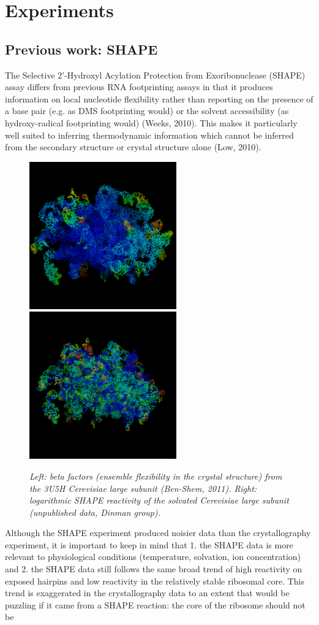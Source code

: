 \documentclass[a4paper,12pt]{article}
\begin{document}
\section{Experiments}
\subsection{Previous work: SHAPE}
The Selective 2'-Hydroxyl Acylation Protection from Exoribonuclease (SHAPE) assay differs from previous RNA footprinting assays in that it produces information on local nucleotide flexibility rather than reporting on the presence of a base pair (e.g. as DMS footprinting would) or the solvent accessibility (as hydroxy-radical footprinting would) (Weeks, 2010). This makes it particularly well suited to inferring thermodynamic information which cannot be inferred from the secondary structure or crystal structure alone (Low, 2010).
\begin{figure}[H]
	\includegraphics[height=2.5in]{beta_heatmap.png}
	\includegraphics[height=2.5in]{dinman_heatmap.png}
	\caption{\it Left: beta factors (ensemble flexibility in the crystal structure) from the 3U5H Cerevisiae large subunit (Ben-Shem, 2011). Right: logarithmic SHAPE reactivity of the solvated Cerevisiae large subunit (unpublished data, Dinman group).}
\end{figure}
Although the SHAPE experiment produced noisier data than the crystallography experiment, it is important to keep in mind that 1. the SHAPE data is more relevant to physiological conditions (temperature, solvation, ion concentration) and 2. the SHAPE data still follows the same broad trend of high reactivity on exposed hairpins and low reactivity in the relatively stable ribosomal core. This trend is exaggerated in the crystallography data to an extent that would be puzzling if it came from a SHAPE reaction: the core of the ribosome should not be 
\end{document}
